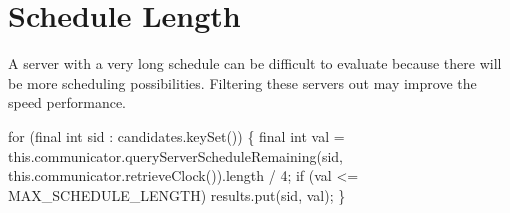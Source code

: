 
\section{Schedule Length}

A server with a very long schedule can be difficult to evaluate because there
will be more scheduling possibilities. Filtering these servers out may improve
the speed performance.

\nwenddocs{}\endmoddef\nwstartdeflinemarkup{}\nwenddeflinemarkup
for (final int sid : candidates.keySet()) \{
  final int val = this.communicator.queryServerScheduleRemaining(sid,
      this.communicator.retrieveClock()).length / 4;
  if (val <= MAX_SCHEDULE_LENGTH)
    results.put(sid, val);
\}
\nwendcode{}\nwdocspar


